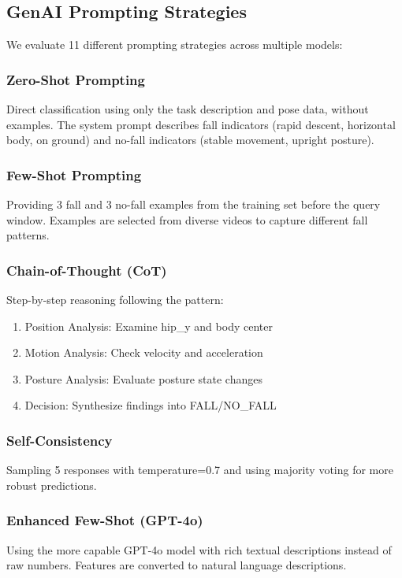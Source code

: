 \documentclass[conference]{IEEEtran}
\begin{document}
\subsection{GenAI Prompting Strategies}

We evaluate 11 different prompting strategies across multiple models:

\subsubsection{Zero-Shot Prompting}
Direct classification using only the task description and pose data, without examples. The system prompt describes fall indicators (rapid descent, horizontal body, on ground) and no-fall indicators (stable movement, upright posture).

\subsubsection{Few-Shot Prompting}
Providing 3 fall and 3 no-fall examples from the training set before the query window. Examples are selected from diverse videos to capture different fall patterns.

\subsubsection{Chain-of-Thought (CoT)}
Step-by-step reasoning following the pattern:
\begin{enumerate}
    \item Position Analysis: Examine hip\_y and body center
    \item Motion Analysis: Check velocity and acceleration
    \item Posture Analysis: Evaluate posture state changes
    \item Decision: Synthesize findings into FALL/NO\_FALL
\end{enumerate}

\subsubsection{Self-Consistency}
Sampling 5 responses with temperature=0.7 and using majority voting for more robust predictions.

\subsubsection{Enhanced Few-Shot (GPT-4o)}
Using the more capable GPT-4o model with rich textual descriptions instead of raw numbers. Features are converted to natural language descriptions.
\end{document}
